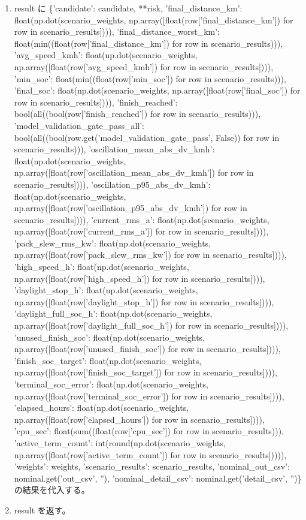 \documentclass[a4paper,11pt]{article}
\begin{document}
\begin{enumerate}[leftmargin=1.8em]
\item result に \{'candidate': candidate, **risk, 'final\_distance\_km': float(np.dot(scenario\_weights, np.array([float(row['final\_distance\_km']) for row in scenario\_results]))), 'final\_distance\_worst\_km': float(min((float(row['final\_distance\_km']) for row in scenario\_results))), 'avg\_speed\_kmh': float(np.dot(scenario\_weights, np.array([float(row['avg\_speed\_kmh']) for row in scenario\_results]))), 'min\_soc': float(min((float(row['min\_soc']) for row in scenario\_results))), 'final\_soc': float(np.dot(scenario\_weights, np.array([float(row['final\_soc']) for row in scenario\_results]))), 'finish\_reached': bool(all((bool(row['finish\_reached']) for row in scenario\_results))), 'model\_validation\_gate\_pass\_all': bool(all((bool(row.get('model\_validation\_gate\_pass', False)) for row in scenario\_results))), 'oscillation\_mean\_abs\_dv\_kmh': float(np.dot(scenario\_weights, np.array([float(row['oscillation\_mean\_abs\_dv\_kmh']) for row in scenario\_results]))), 'oscillation\_p95\_abs\_dv\_kmh': float(np.dot(scenario\_weights, np.array([float(row['oscillation\_p95\_abs\_dv\_kmh']) for row in scenario\_results]))), 'current\_rms\_a': float(np.dot(scenario\_weights, np.array([float(row['current\_rms\_a']) for row in scenario\_results]))), 'pack\_slew\_rms\_kw': float(np.dot(scenario\_weights, np.array([float(row['pack\_slew\_rms\_kw']) for row in scenario\_results]))), 'high\_speed\_h': float(np.dot(scenario\_weights, np.array([float(row['high\_speed\_h']) for row in scenario\_results]))), 'daylight\_stop\_h': float(np.dot(scenario\_weights, np.array([float(row['daylight\_stop\_h']) for row in scenario\_results]))), 'daylight\_full\_soc\_h': float(np.dot(scenario\_weights, np.array([float(row['daylight\_full\_soc\_h']) for row in scenario\_results]))), 'unused\_finish\_soc': float(np.dot(scenario\_weights, np.array([float(row['unused\_finish\_soc']) for row in scenario\_results]))), 'finish\_soc\_target': float(np.dot(scenario\_weights, np.array([float(row['finish\_soc\_target']) for row in scenario\_results]))), 'terminal\_soc\_error': float(np.dot(scenario\_weights, np.array([float(row['terminal\_soc\_error']) for row in scenario\_results]))), 'elapsed\_hours': float(np.dot(scenario\_weights, np.array([float(row['elapsed\_hours']) for row in scenario\_results]))), 'cpu\_sec': float(sum((float(row['cpu\_sec']) for row in scenario\_results))), 'active\_term\_count': int(round(np.dot(scenario\_weights, np.array([float(row['active\_term\_count']) for row in scenario\_results])))), 'weights': weights, 'scenario\_results': scenario\_results, 'nominal\_out\_csv': nominal.get('out\_csv', ''), 'nominal\_detail\_csv': nominal.get('detail\_csv', '')\} の結果を代入する。
\item result を返す。
            \end{enumerate}
\end{document}
